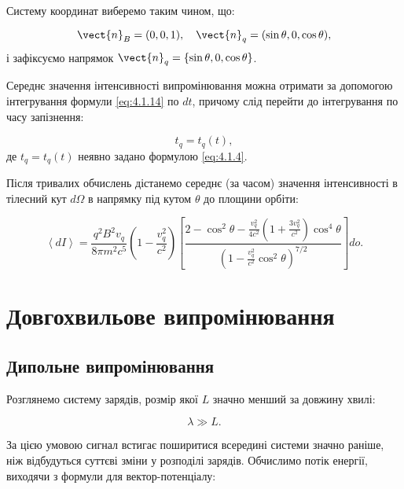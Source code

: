 Систему координат виберемо таким чином, що:

\begin{equation*}
	\vect{n}_B = (0, 0, 1), \quad \vect{n}_q = (\sin \theta, 0, \cos \theta),
\end{equation*}
і зафіксуємо напрямок \( \vect{n}_q = \{\sin \theta, 0, \cos \theta\} \).

Середнє значення інтенсивності випромінювання можна отримати за допомогою інтегрування формули \eqref{eq:4.1.14} по \( dt \), причому слід перейти до
інтегрування по часу запізнення:

\begin{equation*}
	t_q = t_q(t),
\end{equation*}
де \( t_q = t_q(t) \) неявно задано формулою \eqref{eq:4.1.4}.

Після тривалих обчислень дістанемо середнє (за часом) значення інтенсивності в тілесний кут \( d\Omega \) в напрямку під кутом \( \theta \) до площини
орбіти:


\begin{equation*}
	\left\langle dI \right\rangle  = \frac{q^2 B^2 v_q}{8\pi m^2c^5}\left( 1 - \frac{v_q^2}{c^2}\right)  \left[
		\frac{2-\cos^2\theta - \frac{v_q^2}{4c^2}\left( 1 + \frac{3v_q^2}{c^2}\right)\cos^4\theta  }{ \left( 1- \frac{v_q^2}{c^2}\cos^2\theta\right)^{7/2} }
		\right] do.
\end{equation*}


\section{Довгохвильове випромінювання}

\subsection*{Дипольне випромінювання}

Розглянемо систему зарядів, розмір якої \( L \) значно менший за довжину хвилі:

\begin{equation}
	\lambda \gg L.
	\label{eq:long_wavelength_condition}
\end{equation}

За цією умовою сигнал встигає поширитися всередині системи значно раніше, ніж відбудуться суттєві зміни у розподілі зарядів. Обчислимо потік енергії,
виходячи з формули для вектор-потенціалу:

